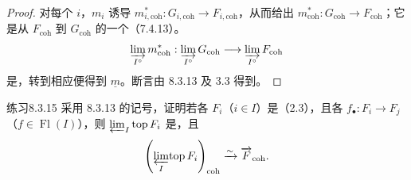 \begin{proof}
对每个 $i$，$m_i$ 诱导 $m_{i,\mathrm{coh}}^*:G_{i,\mathrm{coh}}\to F_{i,\mathrm{coh}}$，从而给出 $m_{\mathrm{coh}}^*:G_{\mathrm{coh}}\to F_{\mathrm{coh}}$；它是从 $F_{\mathrm{coh}}$ 到 $G_{\mathrm{coh}}$ 的一个（7.4.13）。
\[\varinjlim_{I^\circ}m_{\mathrm{coh}}^*:\varinjlim_{I^\circ}G_{\mathrm{coh}}\longrightarrow\varinjlim_{I^\circ}F_{\mathrm{coh}}\]
是，转到相应便得到 $\underline m$。断言由 8.3.13 及 3.3 得到。
\end{proof}
\begin{SGAresult}{练习}{8.3.15}
采用 8.3.13 的记号，证明若各 $F_i$（$i\in I$）是（2.3），且各 $f_\bullet:F_i\to F_j$（$f\in\operatorname{Fl}(I)$），则 $\varprojlim_I\operatorname{top}F_i$
是，且
\[\left(\varprojlim_I\!\operatorname{top}F_i\right)_{\mathrm{coh}}\xrightarrow\sim\overrightarrow F_{\mathrm{coh}}.\]
\end{SGAresult}
